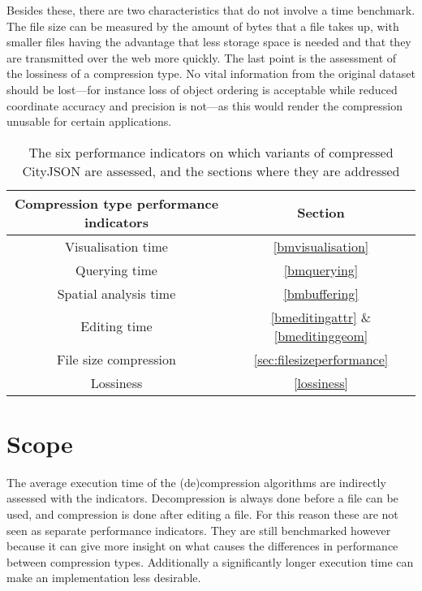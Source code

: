 Besides these, there are two characteristics that do not involve a time benchmark.
The file size can be measured by the amount of bytes that a file takes up, with smaller files having the advantage that less storage space is needed and that they are transmitted over the web more quickly.
The last point is the assessment of the lossiness of a compression type.
No vital information from the original dataset should be lost---for instance loss of object ordering is acceptable while reduced coordinate accuracy and precision is not---as this would render the compression unusable for certain applications.


\begin{table}[h!]
\begin{center}
 \begin{tabular}{ |c|c|} 
 \hline
  Compression type performance indicators & Section \\ [0.5ex] 
 \hline\hline
 Visualisation time & \ref{bmvisualisation}  \\
 \hline
 Querying time & \ref{bmquerying}  \\
 \hline
 Spatial analysis time & \ref{bmbuffering} \\
 \hline
 Editing time & \ref{bmeditingattr} \& \ref{bmeditinggeom}  \\
 \hline
 File size compression & \ref{sec:filesizeperformance}  \\ 
 \hline
 Lossiness & \ref{lossiness} \\
 \hline
\end{tabular}
\caption{The six performance indicators on which variants of compressed CityJSON are assessed, and the sections where they are addressed}
\label{tab:indicators}
\end{center}
\end{table}


\section{Scope} \label{sec:scope}
The average execution time of the (de)compression algorithms are indirectly assessed with the indicators.
Decompression is always done before a file can be used, and compression is done after editing a file.
For this reason these are not seen as separate performance indicators.
They are still benchmarked however because it can give more insight on what causes the differences in performance between compression types.
Additionally a significantly longer execution time can make an implementation less desirable.

